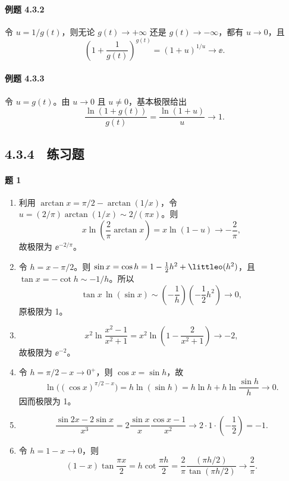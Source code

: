 \paragraph{例题 4.3.2}
\begin{xsolution}
令 $u=1/g(t)$，则无论 $g(t)\to+\infty$ 还是 $g(t)\to-\infty$，都有 $u\to0$，且
\[
  \left(1+\frac1{g(t)}\right)^{g(t)}=(1+u)^{1/u}\to\ee.
\]
\end{xsolution}

\paragraph{例题 4.3.3}
\begin{xsolution}
令 $u=g(t)$。由 $u\to0$ 且 $u\ne0$，基本极限给出
\[
  \frac{\ln(1+g(t))}{g(t)}=\frac{\ln(1+u)}u\to1.
\]
\end{xsolution}

\subsection*{4.3.4　练习题}

\paragraph{题 1}
\begin{xsolution}
\begin{enumerate}[label=(\arabic*)]
  \item 利用 $\arctan x=\pi/2-\arctan(1/x)$，令
  $u=(2/\pi)\arctan(1/x)\sim2/(\pi x)$。则
  \[
    x\ln\left(\frac2\pi\arctan x\right)
    =x\ln(1-u)\to-\frac2\pi,
  \]
  故极限为 $\ee^{-2/\pi}$。

  \item 令 $h=x-\pi/2$。则
  $\sin x=\cos h=1-\frac12h^2+\littleo(h^2)$，且
  $\tan x=-\cot h\sim-1/h$。所以
  \[
    \tan x\,\ln(\sin x)
    \sim\left(-\frac1h\right)\left(-\frac12h^2\right)\to0,
  \]
  原极限为 1。

  \item
  \[
    x^2\ln\frac{x^2-1}{x^2+1}
    =x^2\ln\left(1-\frac2{x^2+1}\right)\to-2,
  \]
  故极限为 $\ee^{-2}$。

  \item 令 $h=\pi/2-x\to0^+$，则 $\cos x=\sin h$，故
  \[
    \ln\bigl((\cos x)^{\pi/2-x}\bigr)=h\ln(\sin h)
    =h\ln h+h\ln\frac{\sin h}{h}\to0.
  \]
  因而极限为 1。

  \item
  \[
    \frac{\sin2x-2\sin x}{x^3}
    =2\frac{\sin x}{x}\frac{\cos x-1}{x^2}\to2\cdot1\cdot\left(-\frac12\right)=-1.
  \]

  \item 令 $h=1-x\to0$，则
  \[
    (1-x)\tan\frac{\pi x}{2}
    =h\cot\frac{\pi h}{2}
    =\frac2\pi\frac{(\pi h/2)}{\tan(\pi h/2)}\to\frac2\pi.
  \]
\end{enumerate}
\end{xsolution}

